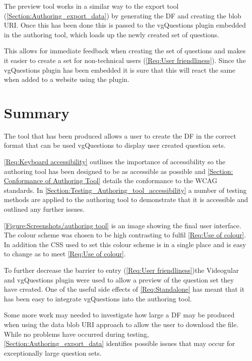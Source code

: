 The preview tool works in a similar way to the export tool (\autoref{Section:Authoring_export_data}) by generating the \gls{DF} and creating the \gls{blob} URI. Once this has been done this is passed to the \gls{vgQuestions} plugin embedded in the authoring tool, which loads up the newly created set of questions.

This allows for immediate feedback when creating the set of questions and makes it easier to create a set for non-technical users (\cref{Req:User friendliness}). Since the \gls{vgQuestions} plugin has been embedded it is sure that this will react the same when added to a website using the plugin.

\section{Summary}
\label{Section:Authoring_Conclusion}

The tool that has been produced allows a user to create the \gls{DF} in the correct format that can be used \gls{vgQuestions} to display user created question sets.

\cref{Req:Keyboard accessibility} outlines the importance of accessibility so the authoring tool has been designed to be as accessible as possible and \autoref{Section: Conformance of Authoring Tool} details the conformance to the \gls{WCAG} standards. In \autoref{Section:Testing_Authoring_tool_accessibility} a number of testing methods are applied to the authoring tool to demonstrate that it is accessible and outlined any further issues.

\autoref{Figure:Screenshots/authoring tool} is an image showing the final user interface. The colour scheme was chosen to be high contrasting to fulfil \cref{Req:Use of colour}. In addition the \gls{CSS} used to set this colour scheme is in a single place and is easy to change as to meet \cref{Req:Use of colour}.

To further decrease the barrier to entry (\cref{Req:User friendliness})the \gls{Videogular} and \gls{vgQuestions} plugin were used to allow a preview of the question set they have created. One of the useful side effects of \cref{Req:Standalone} has meant that it has been easy to integrate \gls{vgQuestions} into the authoring tool.

Some more work may needed to investigate how large a \gls{DF} may be produced when using the data \gls{blob} URI approach to allow the user to download the file. While no problems have occurred during testing, \autoref{Section:Authoring_export_data} identifies possible issues that may occur for exceptionally large question sets.